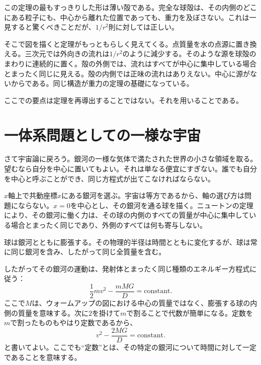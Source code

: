 この定理の最もすっきりした形は薄い殻である。完全な球殻は、その内側のどこにある粒子にも、中心から離れた位置であっても、重力を及ぼさない。これは一見すると驚くべきことだが、\(1/r^2\)則に対しては正しい。

\begin{classroomqa}
\end{classroomqa}

そこで図を描くと定理がもっともらしく見えてくる。点質量を水の点源に置き換える。三次元では外向きの流れは\(1/r^2\)のように減少する。そのような源を球殻のまわりに連続的に置く。殻の外側では、流れはすべてが中心に集中している場合とまったく同じに見える。殻の内側では正味の流れはありえない。中心に源がないからである。同じ構造が重力の定理の基礎になっている。

ここでの要点は定理を再導出することではない。それを用いることである。

\section{一体系問題としての一様な宇宙}

さて宇宙論に戻ろう。銀河の一様な気体で満たされた世界の小さな領域を取る。望むなら自分を中心に置いてもよい。それは単なる便宜にすぎない。誰でも自分を中心と呼ぶことができ、同じ方程式が出てこなければならない。

\(x\)軸上で共動座標\(x\)にある銀河を選ぶ。宇宙は等方であるから、軸の選び方は問題にならない。\(x=0\)を中心とし、その銀河を通る球を描く。ニュートンの定理により、その銀河に働く力は、その球の内側のすべての質量が中心に集中している場合とまったく同じであり、外側のすべては何も寄与しない。

球は銀河とともに膨張する。その物理的半径は時間とともに変化するが、球は常に同じ銀河を含み、したがって同じ全質量を含む。

したがってその銀河の運動は、発射体とまったく同じ種類のエネルギー方程式に従う：
\begin{equation}
\frac{1}{2}mv^2-\frac{mMG}{D}=\text{constant}.
\end{equation}
ここで\(M\)は、ウォームアップの図における中心の質量ではなく、膨張する球の内側の質量を意味する。次に\(2\)を掛けて\(m\)で割ることで代数が簡単になる。定数を\(m\)で割ったものもやはり定数であるから、
\begin{equation}
v^2-\frac{2MG}{D}=\text{constant}.
\end{equation}
と書いてよい。ここでも``定数''とは、その特定の銀河について時間に対して一定であることを意味する。

